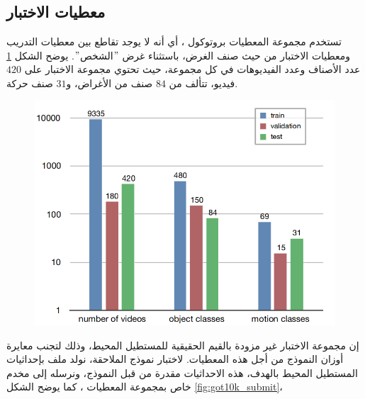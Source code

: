 \subsection{معطيات الاختبار
\label{section:got10k}}
تستخدم مجموعة المعطيات
بروتوكول
،
أي أنه لا يوجد تقاطع بين معطيات التدريب ومعطيات الاختبار من حيث صنف الغرض، باستثناء غرض $"$الشخص$"$.
\newline
يوضح الشكل 
\ref{fig:got10k_split}
عدد الأصناف وعدد الفيديوهات في كل مجموعة، حيث تحتوي مجموعة الاختبار على $420$ فيديو، تتألف من $84$ صنف من الأغراض، و$31$ صنف حركة.
\begin{figure}[!h]
	\centerline{\includegraphics[scale=0.4]{images/got10k_split}}
	\caption{
		}
	\label{fig:got10k_split}
\end{figure}
\newline
إن مجموعة الاختبار غير مزودة بالقيم الحقيقية للمستطيل المحيط، وذلك لتجنب معايرة أوزان النموذج من أجل هذه المعطيات.
لاختبار نموذج الملاحقة، نولد ملف بإحداثيات المستطيل المحيط بالهدف، هذه الاحداثيات مقدرة من قبل النموذج، ونرسله إلى مخدم خاص بمجموعة المعطيات
،
 كما يوضح الشكل
\ref{fig:got10k_submit}،
